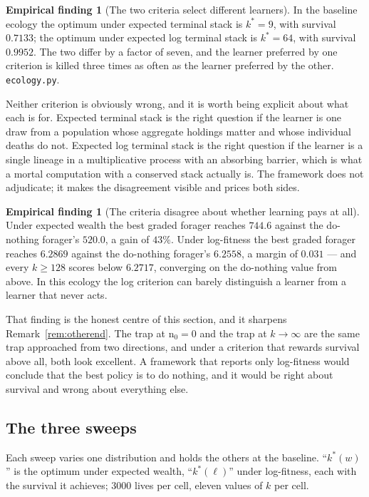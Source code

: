 \documentclass[11pt,a4paper]{article}
\theoremstyle{plain}
\theoremstyle{definition}
\newtheorem{finding}[theorem]{Empirical finding}
\theoremstyle{remark}
\newcommand{\ev}{\mathrm{n}}
\begin{document}
\begin{finding}[The two criteria select different learners]\label{find:twoobj}
In the baseline ecology the optimum under expected terminal stack is $k^* = 9$,
with survival $0.7133$; the optimum under expected log terminal stack is
$k^* = 64$, with survival $0.9952$. The two differ by a factor of seven, and the
learner preferred by one criterion is killed three times as often as the learner
preferred by the other. \texttt{ecology.py}.
\end{finding}

Neither criterion is obviously wrong, and it is worth being explicit about what
each is for. Expected terminal stack is the right question if the learner is one
draw from a population whose aggregate holdings matter and whose individual
deaths do not. Expected log terminal stack is the right question if the learner
is a single lineage in a multiplicative process with an absorbing barrier, which
is what a mortal computation with a conserved stack actually is. The framework
does not adjudicate; it makes the disagreement visible and prices both sides.

\begin{finding}[The criteria disagree about whether learning pays at all]
\label{find:worthit}
Under expected wealth the best graded forager reaches $744.6$ against the
do-nothing forager's $520.0$, a gain of $43\%$. Under log-fitness the best graded
forager reaches $6.2869$ against the do-nothing forager's $6.2558$, a margin of
$0.031$ --- and every $k \ge 128$ scores below $6.2717$, converging on the
do-nothing value from above. In this ecology the log criterion can barely
distinguish a learner from a learner that never acts.
\end{finding}

That finding is the honest centre of this section, and it sharpens
Remark~\ref{rem:otherend}. The trap at $\ev_0 = 0$ and the trap at $k \to \infty$
are the same trap approached from two directions, and under a criterion that
rewards survival above all, both look excellent. A framework that reports only
log-fitness would conclude that the best policy is to do nothing, and it would be
right about survival and wrong about everything else.

\subsection{The three sweeps}

Each sweep varies one distribution and holds the others at the baseline.
``$k^*(w)$'' is the optimum under expected wealth, ``$k^*(\ell)$'' under
log-fitness, each with the survival it achieves; $3000$ lives per cell, eleven
values of $k$ per cell.
\end{document}
